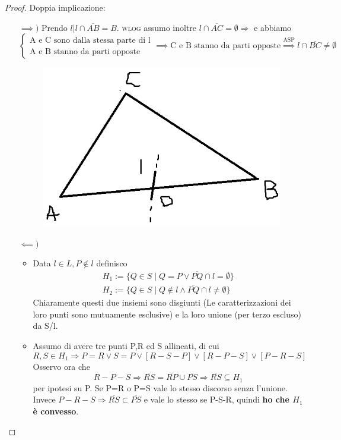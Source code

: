 \documentclass[a4paper,10pt]{article}
\theoremstyle{definition}
\newcommand{\noun}[1]{\textsc{#1}}
\theoremstyle{indentdefinition}
\theoremstyle{indentpostulate}
\theoremstyle{indenttheorem}
\theoremstyle{myremark}
\theoremstyle{indentgeneral}
\begin{document}
\begin{proof} Doppia implicazione:
\begin{itemize}
    \item[$\implies)$] Prendo  $l|l \cap \overline{AB} =B$. \noun{wlog} assumo inoltre $l \cap \overline{AC} = \emptyset \Rightarrow$ e abbiamo
    $$\begin{cases}
        \text{A e C sono dalla stessa parte di l}\\
        \text{A e B stanno da parti opposte}
    \end{cases}\implies\text{C e B stanno da parti opposte}\overset{\text{ASP}}{\implies} l \cap \overline{BC} \neq \emptyset$$

\begin{figure}[H]
    \centering
    \includegraphics[scale=0.25]{ASPePP.png}
\end{figure}
    \item[$\impliedby)$]
    \begin{itemize}
        \item Data $l \in L, P \not \in l$ definisco $$\begin{array}{l}
         H_1:=\{ Q \in S\mid Q=P \lor \overline{PQ} \cap l = \emptyset \}   \\
         H_2:=\{ Q \in S\mid Q \not \in l \land \overline{PQ} \cap l \neq \emptyset \}
    \end{array}$$ Chiaramente questi due insiemi sono disgiunti (Le caratterizzazioni dei loro punti sono mutuamente esclusive) e la loro unione (per terzo escluso) da S/l. 
    \item Assumo di avere tre punti P,R ed S allineati, di cui $$R,S \in H_1\Rightarrow P=R \lor S=P \lor [R-S-P] \lor [R-P-S] \lor [P-R-S]$$ Osservo ora che $$R-P-S \Rightarrow \overline{RS}=\overline{RP} \cup \overline{PS} \Rightarrow \overline{RS} \subseteq H_1$$ per ipotesi su P. Se P=R o P=S vale lo stesso discorso senza l'unione. Invece $P-R-S \Rightarrow \overline{RS} \subset \overline{PS}$ e vale lo stesso se P-S-R, quindi \textbf{ho che $H_1$ è convesso}. 

\end{itemize}
\end{itemize}
\end{proof}
\end{document}
